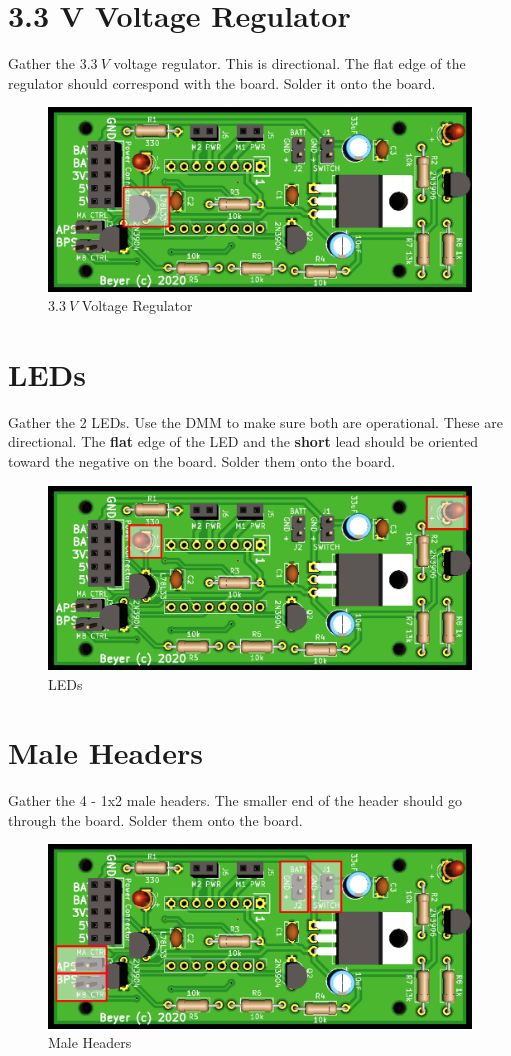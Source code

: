 \documentclass{handout}
\begin{document}
\newpage
\clearpage
\pagebreak

	\section{3.3 V Voltage Regulator}
	Gather the $3.3\ V$ voltage regulator. This is directional. The flat edge of the regulator should correspond with the board. Solder it onto the board.
	
	\begin{figure} [H]
		\centering
		\includegraphics[width=.5\textwidth]{33vreg.png}
		\caption{$3.3\ V$ Voltage Regulator}
	\end{figure}
	
	\section{LEDs}
	Gather the 2 LEDs. Use the DMM to make sure both are operational. These are directional. The \textbf{flat} edge of the LED and the \textbf{short} lead should be oriented toward the negative on the board. Solder them onto the board.
	
	\begin{figure} [H]
		\centering
		\includegraphics[width=.5\textwidth]{leds.png}
		\caption{LEDs}
	\end{figure}
	
	\section{Male Headers}
	Gather the 4 - 1x2 male headers. The smaller end of the header should go through the board. Solder them onto the board.
	
	\begin{figure} [H]
		\centering
		\includegraphics[width=.5\textwidth]{maleheaders.png}
		\caption{Male Headers}
	\end{figure}
\end{document}

